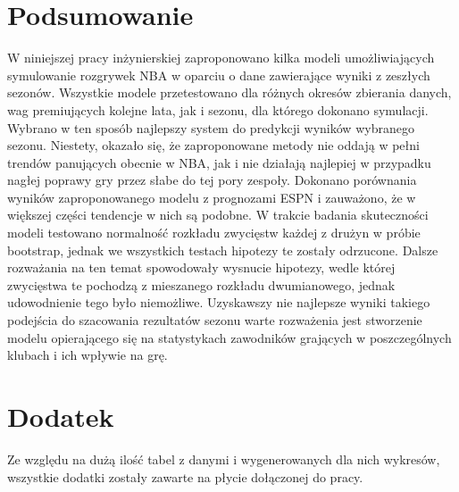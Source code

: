 \documentclass[inzynierska]{pwr_wmat_praca_dyplomowa}
\theoremstyle{plain}
\numberwithin{theorem}{chapter}
\theoremstyle{definition}
\numberwithin{theorem}{chapter}
\begin{document}
{\backmatter \chapter{Podsumowanie}}
W niniejszej pracy inżynierskiej zaproponowano kilka modeli umożliwiających symulowanie rozgrywek NBA w oparciu o dane zawierające wyniki z zeszłych sezonów. Wszystkie modele przetestowano dla różnych okresów zbierania danych, wag premiujących kolejne lata, jak i sezonu, dla którego dokonano symulacji. Wybrano w ten sposób najlepszy system do predykcji wyników wybranego sezonu. Niestety, okazało się, że zaproponowane metody nie oddają w pełni trendów panujących obecnie w NBA, jak i nie działają najlepiej w przypadku nagłej poprawy gry przez słabe do tej pory zespoły. Dokonano porównania wyników zaproponowanego modelu z prognozami ESPN i zauważono, że w większej części tendencje w nich są podobne. W trakcie badania skuteczności modeli testowano normalność rozkładu zwycięstw każdej z drużyn w próbie bootstrap, jednak we wszystkich testach hipotezy te zostały odrzucone. Dalsze rozważania na ten temat spowodowały wysnucie hipotezy, wedle której zwycięstwa te pochodzą z mieszanego rozkładu dwumianowego, jednak udowodnienie tego było niemożliwe. Uzyskawszy nie najlepsze wyniki takiego podejścia do szacowania rezultatów sezonu warte rozważenia jest stworzenie modelu opierającego się na statystykach zawodników grających w poszczególnych klubach i ich wpływie na grę.

{\backmatter \chapter{Dodatek}}
Ze względu na dużą ilość tabel z danymi i wygenerowanych dla nich wykresów, wszystkie dodatki zostały zawarte na płycie dołączonej do pracy.

\newpage
\end{document}
